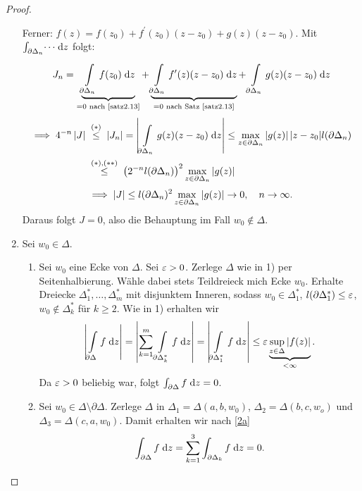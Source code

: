 \documentclass[a4paper,twoside,DIV15,BCOR12mm]{scrbook}
\begin{document}
\begin{proof}
\begin{enumerate}
Ferner: $f(z)=f(z_0) + f^\prime(z_0)(z-z_0) + g(z)(z-z_0)$. Mit $\int_{\partial\Delta_n}^{}{\dotsi}\;\mathrm{d} z$ folgt:
\[ J_n = \underbrace{\int\limits_{\partial\Delta_n}^{}{f(z_0)}\;\mathrm{d}z}_{=0 \text{ nach \ref{satz2.13}}} +
\underbrace{\int\limits_{\partial\Delta_n}^{}{f^\prime(z)(z-z_0)}\;\mathrm{d}z}_{=0 \text{ nach Satz \ref{satz2.13}}} + \int\limits_{\partial\Delta_n}^{}{g(z)(z-z_0)}\;\mathrm{d}z \]
\begin{align*}
  \folgt 4^{-n}\abs{J} &\nach{\le}{($*$)} \abs{J_n} = \abs{\Integral{\partial\Delta_n}{}{g(z)(z-z_0)}{z}} \le
  \max_{z\in\partial\Delta_n}{\abs{g(z)}\abs{z-z_0}}l(\partial\Delta_n) \\
  &\nach{\le}{($*$),($**$)} \left(2^{-n}l(\partial\Delta_n)\right)^2 \max_{z\in\partial\Delta_n}{\abs{g(z)}}
\end{align*}
\[ \implies \left\lvert J\right\lvert \le l(\partial\Delta_n)^2 \max_{z\in\partial\Delta_n}{\left\lvert g(z)\right\lvert} \to 0, \quad n\rightarrow\infty. \]
Daraus folgt $J=0$, also die Behauptung im Fall $w_0\notin\Delta$.
\item Sei $w_0\in\Delta$.
  \begin{enumerate}
  \item \label{2a} Sei $w_0$ eine Ecke von $\Delta$. Sei $\varepsilon>0$. Zerlege $\Delta$ wie in 1) per Seitenhalbierung. Wähle dabei
    stets Teildreieck mich Ecke $w_0$. Erhalte Dreiecke $\Delta_1^*,\dotsc,\Delta_m^*$ mit disjunktem Inneren, sodass
    $w_0\in\Delta_1^*$, $l(\partial\Delta_1^*)\le\varepsilon$, $w_0\notin\Delta_k^*$ für $k\ge2$. Wie in 1) erhalten
    wir \[\left\lvert\int\limits_{\partial\Delta}^{}{f}\;\mathrm{d}z\right\lvert = \left\lvert\sum_{k=1}^m{\int\limits_{\partial\Delta_k^*}^{}{f}\;\mathrm{d}z}\right\lvert =
    \left\lvert\int\limits_{\partial\Delta_1^*}^{}{f}\;\mathrm{d}z\right\lvert \le \varepsilon \underbrace{\sup_{z\in\Delta}{\left\lvert f(z)\right\lvert}}_{<\infty}. \]
    Da $\varepsilon>0$ beliebig war, folgt $\int_{\partial\Delta}^{}{f}\;\mathrm{d} z = 0$.
  \item \label{2b} Sei $w_0\in\Delta\setminus\partial\Delta$. Zerlege $\Delta$ in $\Delta_1=\Delta(a,b,w_0)$,
    $\Delta_2=\Delta(b,c,w_o)$
    und $\Delta_3=\Delta(c,a,w_0)$. Damit erhalten wir nach \ref{2a}
    \[ \int_{\partial\Delta}^{}{f}\;\mathrm{d} z = \sum_{k=1}^{3}{\int_{\partial\Delta_k}^{}{f}\;\mathrm{d} z} = 0. \]
    \begin{center}
\end{center}
\end{enumerate}
\end{enumerate}
\end{proof}
\end{document}
